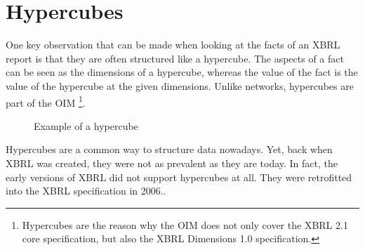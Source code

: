 \section{Hypercubes}
\label{sec:hypercubes}

One key observation that can be made when looking at the facts of an XBRL report is that they are often structured like a hypercube.
The aspects of a fact can be seen as the dimensions of a hypercube, whereas the value of the fact is the value of the hypercube at the given dimensions.
Unlike networks, hypercubes are part of the OIM
\footnote{Hypercubes are the reason why the OIM does not only cover the XBRL 2.1 core specification, but also the XBRL Dimensions 1.0 specification.}.

\begin{figure}[H]
    \caption{Example of a hypercube}
    \label{fig:example_hypercube}
\end{figure}

Hypercubes are a common way to structure data nowadays.
Yet, back when XBRL was created, they were not as prevalent as they are today.
In fact, the early versions of XBRL did not support hypercubes at all.
They were retrofitted into the XBRL specification in 2006.\cite{xbrl_dimensions}.

